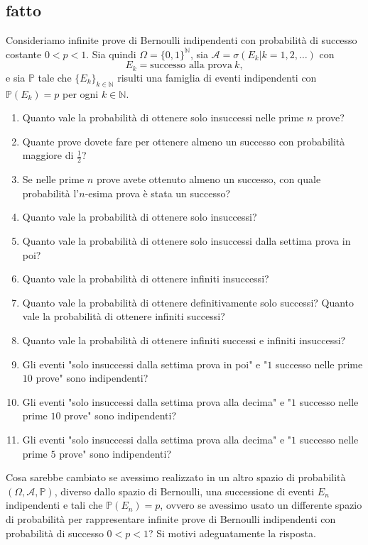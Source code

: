\subsection{fatto}

Consideriamo infinite prove di Bernoulli indipendenti con probabilità di successo costante $0< p< 1$. Sia quindi $\Omega =\{0,1\}^{\mathbb{N}}$, sia $\mathcal{A} =\sigma ( E_{k} |k=1,2,\dotsc )$ con
\begin{equation*}
E_{k} =\text{successo alla prova} \ k,
\end{equation*}
e sia $\mathbb{P}$ tale che $\{E_{k}\}_{k\in \mathbb{N}}$ risulti una famiglia di eventi indipendenti con $\mathbb{P}( E_{k}) =p$ per ogni $k\in \mathbb{N}$.
\begin{enumerate}
\item Quanto vale la probabilità di ottenere solo insuccessi nelle prime $n$ prove?
\item Quante prove dovete fare per ottenere almeno un successo con probabilità maggiore di $\frac{1}{2}$?
\item Se nelle prime $n$ prove avete ottenuto almeno un successo, con quale probabilità l'$n$-esima prova è stata un successo?
\item Quanto vale la probabilità di ottenere solo insuccessi?
\item Quanto vale la probabilità di ottenere solo insuccessi dalla settima prova in poi?
\item Quanto vale la probabilità di ottenere infiniti insuccessi?
\item Quanto vale la probabilità di ottenere definitivamente solo successi? Quanto vale la probabilità di ottenere infiniti successi?
\item Quanto vale la probabilità di ottenere infiniti successi e infiniti insuccessi?
\item Gli eventi "solo insuccessi dalla settima prova in poi" e "$1$ successo nelle prime $10$ prove" sono indipendenti?
\item Gli eventi "solo insuccessi dalla settima prova alla decima" e "$1$ successo nelle prime $10$ prove" sono indipendenti?
\item Gli eventi "solo insuccessi dalla settima prova alla decima" e "$1$ successo nelle prime $5$ prove" sono indipendenti?
\end{enumerate}

Cosa sarebbe cambiato se avessimo realizzato in un altro spazio di probabilità $( \Omega ,\mathcal{A} ,\mathbb{P})$, diverso dallo spazio di Bernoulli, una successione di eventi $E_{n}$ indipendenti e tali che $\mathbb{P}( E_{n}) =p$, ovvero se avessimo usato un differente spazio di probabilità per rappresentare infinite prove di Bernoulli indipendenti con probabilità di successo $0< p< 1$? Si motivi adeguatamente la risposta.
